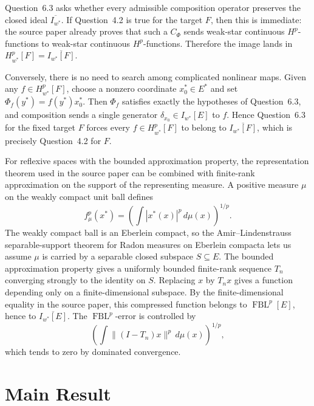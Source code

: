 \documentclass[11pt]{article}
\newcommand{\FBL}{\operatorname{FBL}}
\begin{document}
Question~6.3 asks whether every admissible composition operator preserves the closed ideal
\(\overline{I_{w^*}}\).  If Question~4.2 is true for the target \(F\), then this is immediate:
the source paper already proves that such a \(C_\Phi\) sends weak-star continuous \(H^p\)-functions
to weak-star continuous \(H^p\)-functions.  Therefore the image lands in
\(H_{w^*}^p[F]=\overline{I_{w^*}[F]}\).

Conversely, there is no need to search among complicated nonlinear maps.  Given any
\(f\in H_{w^*}^p[F]\), choose a nonzero coordinate \(x_0^*\in E^*\) and set
\(\Phi_f(y^*)=f(y^*)x_0^*\).  Then \(\Phi_f\) satisfies exactly the hypotheses of Question~6.3, and
composition sends a single generator \(\delta_{x_0}\in I_{w^*}[E]\) to \(f\).  Hence Question~6.3
for the fixed target \(F\) forces every \(f\in H_{w^*}^p[F]\) to belong to
\(\overline{I_{w^*}[F]}\), which is precisely Question~4.2 for \(F\).

For reflexive spaces with the bounded approximation property, the representation theorem used in
the source paper can be combined with finite-rank approximation on the support of the representing
measure.  A positive measure \(\mu\) on the weakly compact unit ball defines
\[
  f_\mu^p(x^*)=\left(\int |x^*(x)|^p\,d\mu(x)\right)^{1/p}.
\]
The weakly compact ball is an Eberlein compact, so the Amir--Lindenstrauss separable-support theorem
for Radon measures on Eberlein compacta lets us assume \(\mu\) is carried by a separable closed
subspace \(S\subseteq E\).  The bounded approximation property gives a uniformly bounded finite-rank
sequence \(T_n\) converging strongly to the identity on \(S\).  Replacing \(x\) by \(T_nx\) gives a
function depending only on a finite-dimensional subspace.  By the finite-dimensional equality in the
source paper, this compressed function belongs to \(\FBL^p[E]\), hence to
\(\overline{I_{w^*}[E]}\).  The \(\FBL^p\)-error is controlled by
\[
  \left(\int \|(I-T_n)x\|^p\,d\mu(x)\right)^{1/p},
\]
which tends to zero by dominated convergence.

\section*{Main Result}
\end{document}
